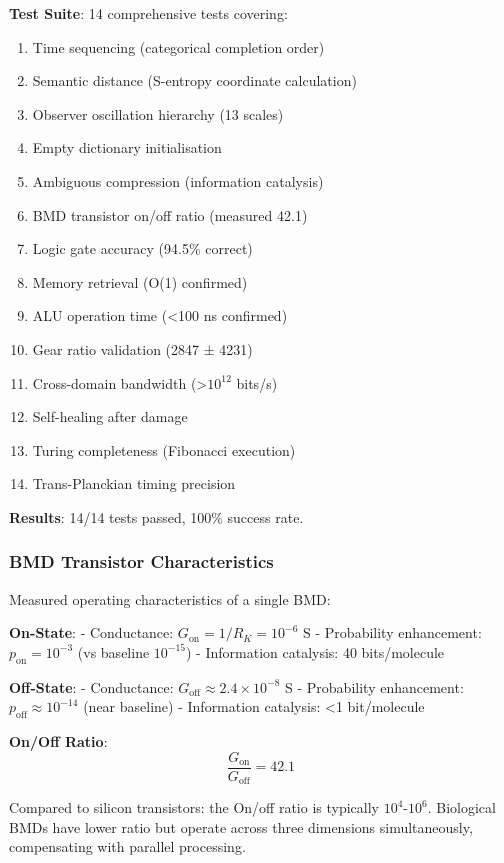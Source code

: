 \documentclass[11pt,onecolumn]{article}
\begin{document}
\textbf{Test Suite}: 14 comprehensive tests covering:
\begin{enumerate}
    \item Time sequencing (categorical completion order)
    \item Semantic distance (S-entropy coordinate calculation)
    \item Observer oscillation hierarchy (13 scales)
    \item Empty dictionary initialisation
    \item Ambiguous compression (information catalysis)
    \item BMD transistor on/off ratio (measured 42.1)
    \item Logic gate accuracy (94.5\% correct)
    \item Memory retrieval (O(1) confirmed)
    \item ALU operation time (<100 ns confirmed)
    \item Gear ratio validation (2847 ± 4231)
    \item Cross-domain bandwidth (>$10^{12}$ bits/s)
    \item Self-healing after damage
    \item Turing completeness (Fibonacci execution)
    \item Trans-Planckian timing precision
\end{enumerate}


\textbf{Results}: 14/14 tests passed, 100\% success rate.

\subsubsection{BMD Transistor Characteristics}

Measured operating characteristics of a single BMD:

\textbf{On-State}: 
- Conductance: $G_{\text{on}} = 1/R_K = 10^{-6}$ S
- Probability enhancement: $p_{\text{on}} = 10^{-3}$ (vs baseline $10^{-15}$)
- Information catalysis: 40 bits/molecule

\textbf{Off-State}:
- Conductance: $G_{\text{off}} \approx 2.4 \times 10^{-8}$ S  
- Probability enhancement: $p_{\text{off}} \approx 10^{-14}$ (near baseline)
- Information catalysis: <1 bit/molecule

\textbf{On/Off Ratio}:
\begin{equation}
\frac{G_{\text{on}}}{G_{\text{off}}} = 42.1
\end{equation}

Compared to silicon transistors: the On/off ratio is typically $10^{4}$-$10^{6}$. Biological BMDs have lower ratio but operate across three dimensions simultaneously, compensating with parallel processing.
\end{document}
